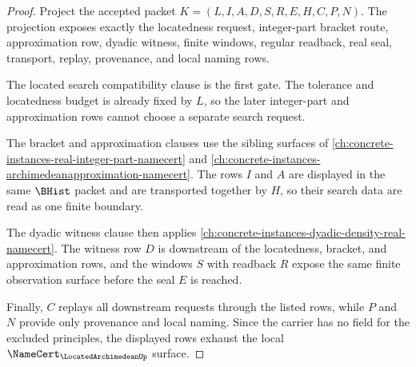 \begin{proof}
Project the accepted packet $K=(L,I,A,D,S,R,E,H,C,P,N)$. The projection exposes exactly the locatedness request, integer-part bracket route, approximation row, dyadic witness, finite windows, regular readback, real seal, transport, replay, provenance, and local naming rows.

The located search compatibility clause is the first gate. The tolerance and locatedness budget is already fixed by $L$, so the later integer-part and approximation rows cannot choose a separate search request.

The bracket and approximation clauses use the sibling surfaces of \autoref{ch:concrete-instances-real-integer-part-namecert} and \autoref{ch:concrete-instances-archimedeanapproximation-namecert}. The rows $I$ and $A$ are displayed in the same $\BHist$ packet and are transported together by $H$, so their search data are read as one finite boundary.

The dyadic witness clause then applies \autoref{ch:concrete-instances-dyadic-density-real-namecert}. The witness row $D$ is downstream of the locatedness, bracket, and approximation rows, and the windows $S$ with readback $R$ expose the same finite observation surface before the seal $E$ is reached.

Finally, $C$ replays all downstream requests through the listed rows, while $P$ and $N$ provide only provenance and local naming. Since the carrier has no field for the excluded principles, the displayed rows exhaust the local $\NameCert_{\LocatedArchimedeanUp}$ surface.
\end{proof}


